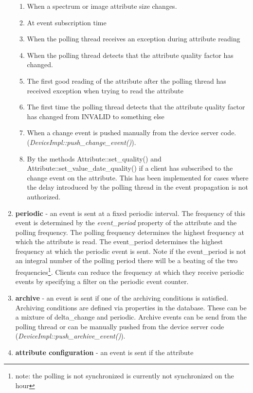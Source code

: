 \begin{enumerate}
\begin{enumerate}
\item When a spectrum or image attribute size changes.
\item At event subscription time
\item When the polling thread receives an exception during attribute reading
\item When the polling thread detects that the attribute quality factor
has changed.
\item The first good reading of the attribute after the polling thread has
received exception when trying to read the attribute
\item The first time the polling thread detects that the attribute quality
factor has changed from INVALID to something else
\item When a change event is pushed manually from the device server code.
(\emph{DeviceImpl::push\_change\_event()}).
\item By the methods Attribute::set\_quality() and Attribute::set\_value\_date\_quality()
if a client has subscribed to the change event on the attribute. This
has been implemented for cases where the delay introduced by the polling
thread in the event propagation is not authorized.
\end{enumerate}
\item \textbf{periodic} - an event is sent at a fixed periodic
interval. The frequency of this event is determined by the \emph{event\_period}
property of the attribute and the polling frequency. The polling frequency
determines the highest frequency at which the attribute is read. The
event\_period determines the highest frequency at which the periodic
event is sent. Note if the event\_period is not an integral number
of the polling period there will be a beating of the two frequencies\footnote{note: the polling is not synchronized is currently not synchronized
on the hour}. Clients can reduce the frequency at which they receive periodic
events by specifying a filter on the periodic event counter. 
\item \textbf{archive} - an event is sent if one of the
archiving conditions is satisfied. Archiving conditions are defined
via properties in the database. These can be a mixture of delta\_change
and periodic. Archive events can be send from the polling thread or
can be manually pushed from the device server code (\emph{DeviceImpl::push\_archive\_event()}).
\item \textbf{attribute configuration} - an event is sent if the attribute

\end{enumerate}
